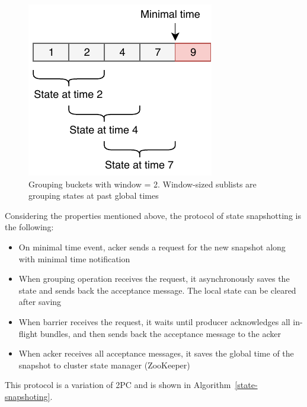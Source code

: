 \begin{figure}[htbp]
  \centering
  \includegraphics[width=.3\textwidth]{pics/substate}
  \caption{Grouping buckets with window = 2. Window-sized sublists are grouping states at past global times}
  \label {substate}
\end{figure}

Considering the properties mentioned above, the protocol of state snapshotting is the following:

\begin{itemize}
    \item On minimal time event, acker sends a request for the new snapshot along with minimal time notification
    \item When grouping operation receives the request, it asynchronously saves the state and sends back the acceptance message. The local state can be cleared after saving
    \item When barrier receives the request, it waits until producer acknowledges all in-flight bundles, and then sends back the acceptance message to the acker
    \item When acker receives all acceptance messages, it saves the global time of the snapshot to cluster state manager (ZooKeeper) 
\end{itemize}

This protocol is a variation of 2PC and is shown in Algorithm~\ref{state-snapshoting}.


